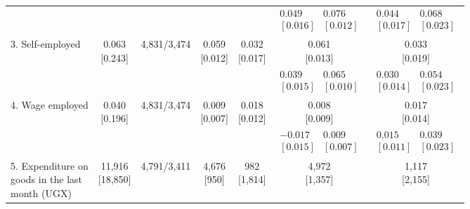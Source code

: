 \begin{table}[H]
{\begin{tabular}{lcccccc}
 &  &  &  &  & $\begin{array}{cc} 0.049 & 0.076\\{[ 0.016 ]} & {[ 0.012 ]}\end{array}$ & $\begin{array}{cc} 0.044 & 0.068\\{[ 0.017 ]} & {[ 0.023 ]}\end{array}$\\
3. Self-employed & \makecell[c]{0.063\\{[0.243]}} & 4,831/3,474 & \makecell[c]{0.059\\{[0.012]}} & \makecell[c]{0.032\\{[0.017]}} & \makecell[c]{0.061\\{[0.013]}} & \makecell[c]{0.033\\{[0.019]}}\\
\addlinespace
 &  &  &  &  & $\begin{array}{cc} 0.039 & 0.065\\{[ 0.015 ]} & {[ 0.010 ]}\end{array}$ & $\begin{array}{cc} 0.030 & 0.054\\{[ 0.014 ]} & {[ 0.023 ]}\end{array}$\\
4. Wage employed & \makecell[c]{0.040\\{[0.196]}} & 4,831/3,474 & \makecell[c]{0.009\\{[0.007]}} & \makecell[c]{0.018\\{[0.012]}} & \makecell[c]{0.008\\{[0.009]}} & \makecell[c]{0.017\\{[0.014]}}\\
 &  &  &  &  & $\begin{array}{cc} -0.017 & 0.009\\{[ 0.015 ]} & {[ 0.007 ]}\end{array}$ & $\begin{array}{cc} 0.015 & 0.039\\{[ 0.011 ]} & {[ 0.023 ]}\end{array}$\\
\makecell[l]{5. Expenditure on\\\hspace{1em}goods in the last\\\hspace{1em}month (UGX)} & \makecell[c]{11,916\\{[18,850]}} & 4,791/3,411 & \makecell[c]{4,676\\{[950]}} & \makecell[c]{982\\{[1,814]}} & \makecell[c]{4,972\\{[1,357]}} & \makecell[c]{1,117\\{[2,155]}}\\

\end{tabular}}
\end{table}
